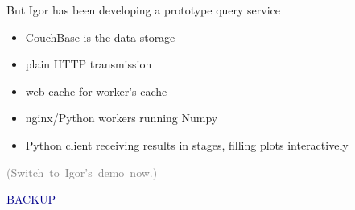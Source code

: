 \documentclass[aspectratio=169]{beamer}
\begin{document}
\begin{frame}{But Igor has been developing a prototype query service}
\Large
\vspace{0.5 cm}
\begin{itemize}
\item CouchBase is the data storage
\item plain HTTP transmission
\item web-cache for worker's cache
\item nginx/Python workers running Numpy
\item Python client receiving results in stages, filling plots interactively
\end{itemize}

\begin{center}
\textcolor{gray}{\mbox{(Switch to Igor's demo now.)\hspace{1 cm}}}
\end{center}
\end{frame}

\begin{frame}{}
\huge
\begin{center}
\textcolor{darkblue}{BACKUP}
\end{center}
\end{frame}
\end{document}

